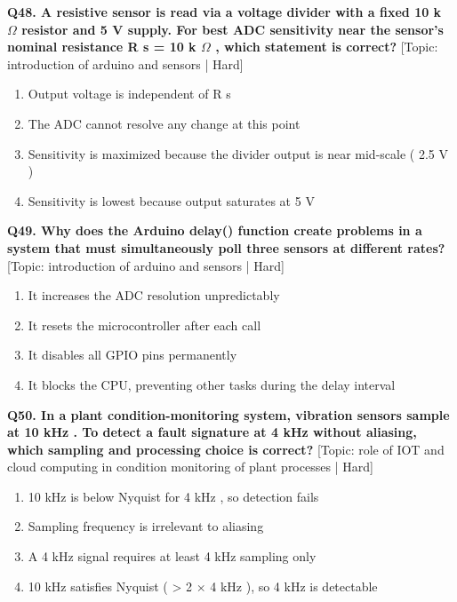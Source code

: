 \noindent\textbf{Q48. A resistive sensor is read via a voltage divider with a fixed 10 k $\Omega$ resistor and 5 V supply. For best ADC sensitivity near the sensor's nominal resistance R s = 10 k $\Omega$ , which statement is correct?} \hfill [Topic: introduction of arduino and sensors | Hard]
\begin{enumerate}[label=(\alph*),topsep=2pt,itemsep=1pt,partopsep=0pt,parsep=0pt]
    \item {Output voltage is independent of R s}
    \item {The ADC cannot resolve any change at this point}
    \item {Sensitivity is maximized because the divider output is near mid-scale ( 2.5 V )}
    \item {Sensitivity is lowest because output saturates at 5 V}
\end{enumerate}
\vspace{2mm}

\noindent\textbf{Q49. Why does the Arduino delay() function create problems in a system that must simultaneously poll three sensors at different rates?} \hfill [Topic: introduction of arduino and sensors | Hard]
\begin{enumerate}[label=(\alph*),topsep=2pt,itemsep=1pt,partopsep=0pt,parsep=0pt]
    \item {It increases the ADC resolution unpredictably}
    \item {It resets the microcontroller after each call}
    \item {It disables all GPIO pins permanently}
    \item {It blocks the CPU, preventing other tasks during the delay interval}
\end{enumerate}
\vspace{2mm}

\noindent\textbf{Q50. In a plant condition-monitoring system, vibration sensors sample at 10 kHz . To detect a fault signature at 4 kHz without aliasing, which sampling and processing choice is correct?} \hfill [Topic: role of IOT and cloud computing in condition monitoring of plant processes | Hard]
\begin{enumerate}[label=(\alph*),topsep=2pt,itemsep=1pt,partopsep=0pt,parsep=0pt]
    \item {10 kHz is below Nyquist for 4 kHz , so detection fails}
    \item {Sampling frequency is irrelevant to aliasing}
    \item {A 4 kHz signal requires at least 4 kHz sampling only}
    \item {10 kHz satisfies Nyquist ( > 2 $\times$ 4 kHz ), so 4 kHz is detectable}
\end{enumerate}
\vspace{2mm}

